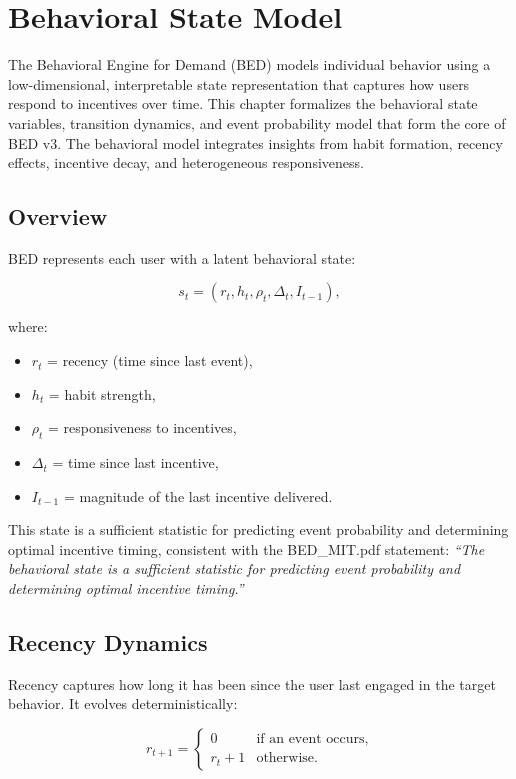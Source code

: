 \chapter{Behavioral State Model}

The Behavioral Engine for Demand (BED) models individual behavior using a
low-dimensional, interpretable state representation that captures how users
respond to incentives over time. This chapter formalizes the behavioral state
variables, transition dynamics, and event probability model that form the core
of BED v3. The behavioral model integrates insights from habit formation,
recency effects, incentive decay, and heterogeneous responsiveness.

\section{Overview}

BED represents each user with a latent behavioral state:


\[
s_t = (r_t, h_t, \rho_t, \Delta_t, I_{t-1}),
\]


where:
\begin{itemize}
    \item $r_t$ = recency (time since last event),
    \item $h_t$ = habit strength,
    \item $\rho_t$ = responsiveness to incentives,
    \item $\Delta_t$ = time since last incentive,
    \item $I_{t-1}$ = magnitude of the last incentive delivered.
\end{itemize}

This state is a sufficient statistic for predicting event probability and
determining optimal incentive timing, consistent with the BED\_MIT.pdf statement:
\textit{“The behavioral state is a sufficient statistic for predicting event
probability and determining optimal incentive timing.”}

\section{Recency Dynamics}

Recency captures how long it has been since the user last engaged in the target
behavior. It evolves deterministically:


\[
r_{t+1} =
\begin{cases}
0 & \text{if an event occurs}, \\
r_t + 1 & \text{otherwise}.
\end{cases}
\]



